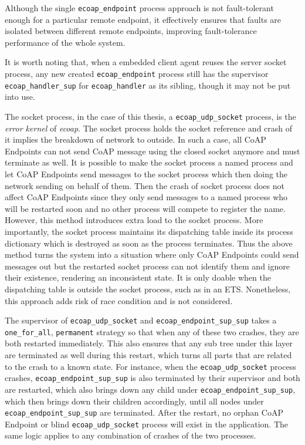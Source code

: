 Although the single \verb|ecoap_endpoint| process approach is not fault-tolerant enough for a particular remote endpoint, it effectively ensures that faults are isolated between different remote endpoints, improving fault-tolerance performance of the whole system. 

It is worth noting that, when a embedded client agent reuses the server socket process, any new created \verb|ecoap_endpoint| process still has the supervisor \verb|ecoap_handler_sup| for \verb|ecoap_handler| as its sibling, though it may not be put into use. 

The socket process, in the case of this thesis, a \verb|ecoap_udp_socket| process, is the \textit{error kernel} of \textit{ecoap}. The socket process holds the socket reference and crash of it implies the breakdown of network to outside. In such a case, all CoAP Endpoints can not send CoAP message using the closed socket anymore and must terminate as well. It is possible to make the socket process a named process and let CoAP Endpoints send messages to the socket process which then doing the network sending on behalf of them. Then the crash of socket process does not affect CoAP Endpoints since they only send messages to a named process who will be restarted soon and no other process will compete to register the name. However, this method introduces extra load to the socket process. More importantly, the socket process maintains its dispatching table inside its process dictionary which is destroyed as soon as the process terminates. Thus the above method turns the system into a situation where only CoAP Endpoints could send messages out but the restarted socket process can not identify them and ignore their existence, rendering an inconsistent state. It is only doable when the dispatching table is outside the socket process, such as in an ETS. Nonetheless, this approach adds risk of race condition and is not considered. 

The supervisor of \verb|ecoap_udp_socket| and \verb|ecoap_endpoint_sup_sup| takes a \verb|one_for_all|, \verb|permanent| strategy so that when any of these two crashes, they are both restarted immediately. This also ensures that any sub tree under this layer are terminated as well during this restart, which turns all parts that are related to the crash to a known state. For instance, when the \verb|ecoap_udp_socket| process crashes, \verb|ecoap_endpoint_sup_sup| is also terminated by their supervisor and both are restarted, which also brings down any child under \verb|ecoap_endpoint_sup_sup|, which then brings down their children accordingly, until all nodes under \verb|ecoap_endpoint_sup_sup| are terminated. After the restart, no orphan CoAP Endpoint or blind \verb|ecoap_udp_socket| process will exist in the application. The same logic applies to any combination of crashes of the two processes.

